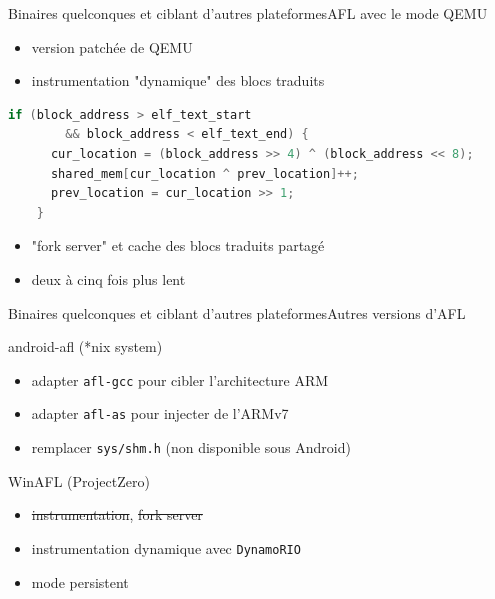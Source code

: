 \begin{frame}[fragile]{Binaires quelconques et ciblant d'autres plateformes}{AFL avec le mode QEMU}
  \begin{itemize}
  \item version patchée de QEMU
  \item instrumentation "dynamique" des blocs traduits
  \end{itemize}

  \begin{lstlisting}[language=C]
    if (block_address > elf_text_start
        && block_address < elf_text_end) {
      cur_location = (block_address >> 4) ^ (block_address << 8);
      shared_mem[cur_location ^ prev_location]++;
      prev_location = cur_location >> 1;
    }
  \end{lstlisting}

  \begin{itemize}
  \item "fork server" et cache des blocs traduits partagé
  \item deux à cinq fois plus lent
  \end{itemize}
\end{frame}

\begin{frame}{Binaires quelconques et ciblant d'autres plateformes}{Autres versions d'AFL}
  \begin{block}{android-afl (*nix system)}
    \begin{itemize}
    \item adapter \lstinline{afl-gcc} pour cibler l'architecture ARM
    \item adapter \lstinline{afl-as} pour injecter de l'ARMv7
    \item remplacer \lstinline{sys/shm.h} (non disponible sous Android)
    \end{itemize}
  \end{block}

  \begin{exampleblock}{WinAFL (ProjectZero)}
	  \begin{itemize}
	  \item \sout{instrumentation}, \sout{fork server}
    \item instrumentation dynamique avec \lstinline{DynamoRIO}
    \item mode persistent
	  \end{itemize}
  \end{exampleblock}
\end{frame}
